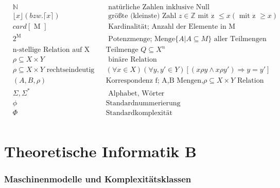 \documentclass[10pt,oneside,a4paper]{scrartcl}
\begin{document}
    \begin{align}
    & \mathbb{N} && \text{ natürliche Zahlen inklusive Null} &&\\
    &  \lfloor x \rfloor (  bzw. \lceil x \rceil )
          && \text{  größte (kleinste) Zahl } z \in \mathbb{Z }
                \text{ mit z } \le x ( \text{ mit z } \ge x)\\  %
    & card [ \text{ M } ]
         && \text{ Kardinalität; Anzahl der Elemente in M }   \\ %
    & 2^\text{M}
         && \text{ Potenzmenge; Menge}  \{A | A \subseteq M \}  \text{ aller Teilmengen} \\
    & \text{n-stellige Relation auf X}
         &&   \text{Teilmenge } Q\subseteq X^n\\
    & \rho \subseteq X \times Y 
         && \text{  binäre Relation}\\
    &  \rho \subseteq X \times Y  \text{ rechtseindeutig}
         &&  (\forall x \in X)(\forall y,y' \in Y) [ (x\rho y \wedge x \rho y') \Rightarrow y = y' ] \\
    & (A,B,\rho)
         && \text{Korrespondenz f; A,B Mengen,} \rho \subseteq X \times Y  \text{ Relation  }\\
   & \Sigma, \Sigma^* && \text{ Alphabet, Wörter } \\
   & \phi && \text{Standardnummerierung} \\
   & \Phi && \text{Standardkomplexität } \\
    \end{align}

\pagebreak

\part{Theoretische Informatik B}

\section{Maschinenmodelle und Komplexitätsklassen}
\end{document}
